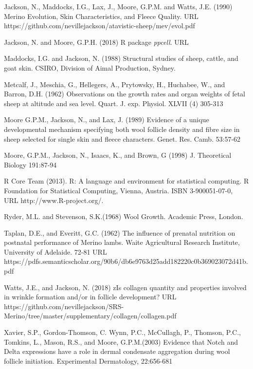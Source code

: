 \documentclass[titlepage]{article}  %
\begin{document}
\begin{thebibliography}{99}
Jackson, N., Maddocks, I.G., Lax, J., Moore, G.P.M. and Watts, J.E. (1990) Merino Evolution, Skin Characteristics, and Fleece Quality. URL https://github.com/nevillejackson/atavistic-sheep/mev/evol.pdf 

Jackson, N. and Moore, G.P.H. (2018) R package {\em ppcell}. URL

Maddocks, I.G. and Jackson, N. (1988) Structural studies of sheep, cattle, and goat skin. CSIRO, Division of Aimal Production, Sydney.

Metcalf, J., Meschia, G., Hellegers, A., Prytowsky, H., Huchabee, W., and Barron, D.H. (1962) Observations on the growth rates and organ weights of fetal sheep at altitude and sea level. Quart. J. exp. Physiol. XLVII (4) 305-313

Moore G.P.M., Jackson, N., and Lax, J. (1989) Evidence of a unique developmental mechanism specifying both wool follicle density and fibre size in sheep selected for single skin and fleece characters. Genet. Res. Camb. 53:57-62

Moore, G.P.M., Jackson, N., Isaacs, K., and Brown, G (1998) J. Theoretical Biology 191:87-94

R Core Team (2013). R: A language and environment for statistical
  computing. R Foundation for Statistical Computing, Vienna, Austria.
  ISBN 3-900051-07-0, URL http://www.R-project.org/.

Ryder, M.L. and Stevenson, S.K.(1968) Wool Growth. Academic Press, London.

Taplan, D.E., and Everitt, G.C. (1962) The influence of prenatal nutrition on postnatal performance of Merino lambs. Waite Agricultural Research Institute, University of Adelaide. 72-81 URL https://pdfs.semanticscholar.org/90b6/db6e9763d25add182220c0b369023072d41b.pdf

Watts, J.E., and Jackson, N. (2018) zIs collagen quantity and properties involved in wrinkle formation and/or in follicle development? URL https://github.com/nevillejackson/SRS-Merino/tree/master/supplementary/collagen/collagen.pdf

Xavier, S.P., Gordon-Thomson, C. Wynn, P.C., McCullagh, P., Thomson, P.C., Tomkins, L., Mason, R.S., and Moore, G.P.M.(2003) Evidence that Notch and Delta expressions have a role in dermal condensate aggregation during wool follicle initiation. Experimental Dermatology, 22:656-681

\end{thebibliography}
\end{document}
